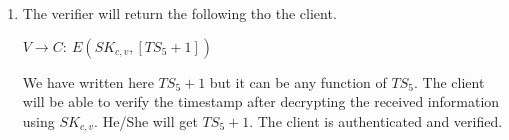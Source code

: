 \documentclass[11pt]{article}
\begin{document}
\begin{enumerate}
    \item The verifier will return the following tho the client.
    \begin{center}
        $V \rightarrow C: \ E({SK}_{c,v}, [{TS}_5 + 1])$
    \end{center}
    We have written here ${TS}_5 + 1$ but it can be any function of ${TS}_5$. The client will be able to verify the timestamp after decrypting the received information using ${SK}_{c,v}$. He/She will get ${TS}_5 + 1$. The client is authenticated and verified.
\end{enumerate}
\end{document}
